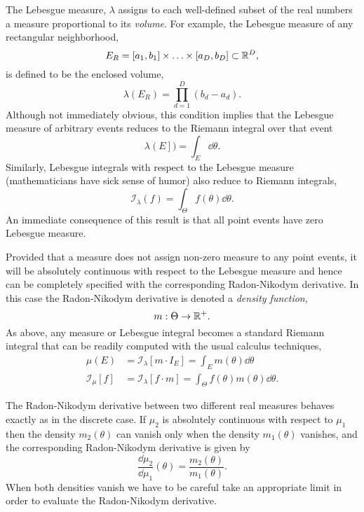 The Lebesgue measure, $\lambda$ assigns to each well-defined 
subset of the real numbers a measure proportional to its \emph{volume}.  
For example, the Lebesgue measure of any rectangular neighborhood, 
%
\begin{equation*}
E_{R} = 
\left[a_{1}, b_{1} \right] \times \ldots \times \left[a_{D}, b_{D} \right] 
\subset \mathbb{R}^{D},
\end{equation*}
%
is defined to be the enclosed volume,
%
\begin{equation*}
\lambda \! \left( E_{R} \right) = 
\prod_{d = 1}^{D} \left(b_{d} - a_{d} \right).  
\end{equation*}
%
Although not immediately obvious, this condition implies that the 
Lebesgue measure of arbitrary events reduces to the Riemann integral 
over that event
%
\begin{equation*}
\lambda \! \left( E \right])= \int_{E} \dd \theta.
\end{equation*}
%
Similarly, Lebesgue integrals with respect to the Lebesgue measure
(mathematicians have sick sense of humor) also reduce to Riemann
integrals,
%
\begin{equation*}
\mathcal{I}_{\lambda} \! \left( f \right)
= \int_{\Theta} f \! \left( \theta \right) \dd \theta.
\end{equation*}
%
An immediate consequence of this result is that all point events
have zero Lebesgue measure.

Provided that a measure does not assign non-zero measure to any
point events, it will be absolutely continuous with respect to the
Lebesgue measure and hence can be completely specified with
the corresponding Radon-Nikodym derivative.  In this case the
Radon-Nikodym derivative is denoted a \emph{density function},
%
\begin{equation*}
m : \Theta \rightarrow \mathbb{R}^{+}.
\end{equation*}
%
As above, any measure or Lebesgue integral becomes a standard
Riemann integral that can be readily computed with the usual
calculus techniques,
%
\begin{align*}
\mu \! \left( E \right)
&=
\mathcal{I}_{\lambda} \! \left[ m \cdot I_{E} \right]
=
\int_{E} m \! \left( \theta \right) \dd \theta
\\
\mathcal{I}_{\mu} \! \left[ f \right]
&=
\mathcal{I}_{\lambda} \! \left[ f \cdot m \right]
=
\int_{\Theta} f \! \left( \theta \right) m \! \left( \theta \right) \dd \theta.
\end{align*}

The Radon-Nikodym derivative between two different real measures
behaves exactly as in the discrete case.  If $\mu_{2}$ is
absolutely continuous with respect to $\mu_{1}$ then the density
$m_{2} \! \left( \theta \right)$ can vanish only when the density
$m_{1} \! \left( \theta \right)$ vanishes, and the corresponding 
Radon-Nikodym derivative is given by
%
\begin{equation*}
\frac{ \dd \mu_{2} }{ \dd \mu_{1} } \! \left( \theta \right)
=
\frac{ m_{2} \! \left( \theta \right) }{ m_{1} \! \left( \theta \right) }.
\end{equation*}
%
When both densities vanish we have to be careful take an
appropriate limit in order to evaluate the Radon-Nikodym derivative.

